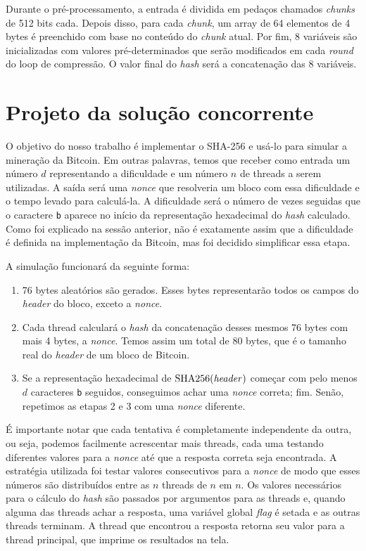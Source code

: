 \documentclass[12pt]{article}
\DeclareMathOperator{\sha}{SHA256}
\begin{document}
Durante o pré-processamento,
a entrada é dividida em
pedaços chamados \textit{chunks} de 512 bits cada.
Depois disso, para cada \textit{chunk},
um array de 64 elementos de 4 bytes é
preenchido com base no conteúdo do \textit{chunk} atual.
Por fim, 8 variáveis são inicializadas com valores pré-determinados
que serão modificados em cada \textit{round} do loop de compressão.
O valor final do \textit{hash} será a concatenação das 8 variáveis.

\section{Projeto da solução concorrente}
O objetivo do nosso trabalho é
implementar o SHA-256 e
usá-lo para simular a mineração da Bitcoin.
Em outras palavras,
temos que receber como entrada
um número $d$ representando a dificuldade e
um número $n$ de threads a serem utilizadas.
A saída será uma \textit{nonce} que
resolveria um bloco com essa dificuldade e
o tempo levado para calculá-la.
A dificuldade será o número de vezes seguidas 
que o caractere \texttt{\textquotesingle{}b\textquotesingle{}} aparece no
início da representação hexadecimal do \textit{hash} calculado.
Como foi explicado na sessão anterior,
não é exatamente assim que a dificuldade é definida
na implementação da Bitcoin,
mas foi decidido simplificar essa etapa.

A simulação funcionará da seguinte forma:
\begin{enumerate}
	\item 76 bytes aleatórios são gerados.
		Esses bytes representarão todos os campos
		do \textit{header} do bloco,
		exceto a \textit{nonce}.
	\item Cada thread calculará o \textit{hash} da concatenação
		desses mesmos 76 bytes com mais 4 bytes, a \textit{nonce}.
		Temos assim um total de 80 bytes,
		que é o tamanho real do \textit{header} de
		um bloco de Bitcoin.
	\item Se a representação hexadecimal de $\sha(\text{\textit{header}})$
		começar com pelo menos $d$ caracteres \texttt{\textquotesingle{}b\textquotesingle{}} seguidos,
		conseguimos achar uma \textit{nonce} correta; fim.
		Senão, repetimos as etapas 2 e 3
		com uma \textit{nonce} diferente.
\end{enumerate}

É importante notar que cada tentativa
é completamente independente da outra, ou seja,
podemos facilmente acrescentar mais threads,
cada uma testando diferentes valores para a \textit{nonce}
até que a resposta correta seja encontrada.
A estratégia utilizada foi
testar valores consecutivos para a \textit{nonce}
de modo que esses números são distribuídos
entre as $n$ threads de $n$ em $n$.
Os valores necessários para o cálculo do \textit{hash}
são passados por argumentos para as threads e,
quando alguma das threads achar a resposta,
uma variável global \textit{flag} é setada
e as outras threads terminam.
A thread que encontrou a resposta
retorna seu valor para a thread principal,
que imprime os resultados na tela.
\end{document}
